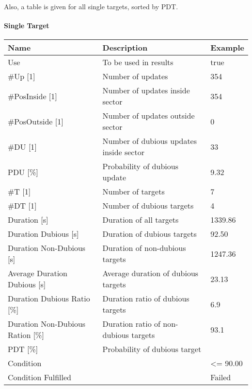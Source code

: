 Also, a table is given for all single targets, sorted by PDT.

\paragraph{Single Target}

\begin{center}
 \begin{table}[H]
  \begin{tabularx}{\textwidth}{ | l | X |  l | }
    \hline
    \textbf{Name} & \textbf{Description} & \textbf{Example} \\ \hline
    Use & To be used in results & true \\ \hline
    \#Up [1] & Number of updates & 354 \\ \hline
    \#PosInside [1] & Number of updates inside sector & 354 \\ \hline
    \#PosOutside [1] & Number of updates outside sector & 0 \\ \hline
    \#DU [1] & Number of dubious updates inside sector & 33 \\ \hline
    PDU [\%] & Probability of dubious update & 9.32 \\ \hline
    \#T [1] & Number of targets & 7 \\ \hline
    \#DT [1] & Number of dubious targets & 4 \\ \hline
    Duration [s] & Duration of all targets & 1339.86 \\ \hline
    Duration Dubious [s] & Duration of dubious targets & 92.50 \\ \hline
    Duration Non-Dubious [s] & Duration of non-dubious targets & 1247.36 \\ \hline
    Average Duration Dubious [s] & Average duration of dubious targets & 23.13 \\ \hline
    Duration Dubious Ratio [\%] & Duration ratio of dubious targets & 6.9 \\ \hline
    Duration Non-Dubious Ration [\%] & Duration ratio of non-dubious targets & 93.1 \\ \hline
    PDT [\%] & Probability of dubious target &  \\ \hline
    Condition &  & <= 90.00 \\ \hline
    Condition Fulfilled &  & Failed \\ \hline
\end{tabularx}
\end{table}
\end{center}

